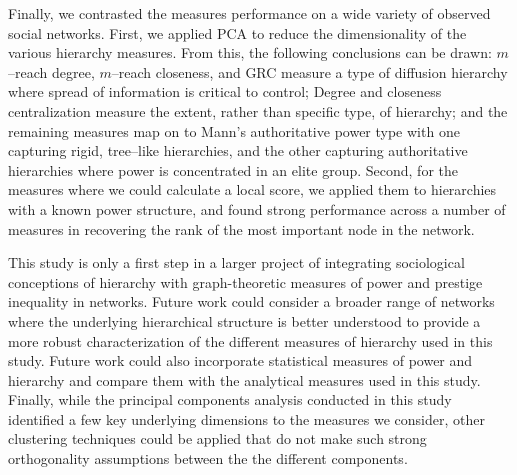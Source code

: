 \documentclass[3p,times]{elsarticle}
\begin{document}
Finally, we contrasted the measures performance on a wide variety of observed social networks. First, we applied PCA to reduce the dimensionality of the various hierarchy measures. From this, the following conclusions can be drawn: $m$--reach degree, $m$--reach closeness, and GRC measure a type of diffusion hierarchy where spread of information is critical to control; Degree and closeness centralization measure the extent, rather than specific type, of hierarchy; and the remaining measures map on to Mann's authoritative power type with one capturing rigid, tree--like hierarchies, and the other capturing authoritative hierarchies where power is concentrated in an elite group. Second, for the measures where we could calculate a local score, we applied them to hierarchies with a known power structure, and found strong performance across a number of measures in recovering the rank of the most important node in the network.

This study is only a first step in a larger project of integrating sociological conceptions of hierarchy with graph-theoretic measures of power and prestige inequality in networks. Future work could consider a broader range of networks where the underlying hierarchical structure is better understood to provide a more robust characterization of the different measures of hierarchy used in this study. Future work could also incorporate statistical measures of power and hierarchy and compare them with the analytical measures used in this study. Finally, while the principal components analysis conducted in this study identified a few key underlying dimensions to the measures we consider, other clustering techniques could be applied that do not make such strong orthogonality assumptions between the the different components.   


%
\clearpage

\end{document}
